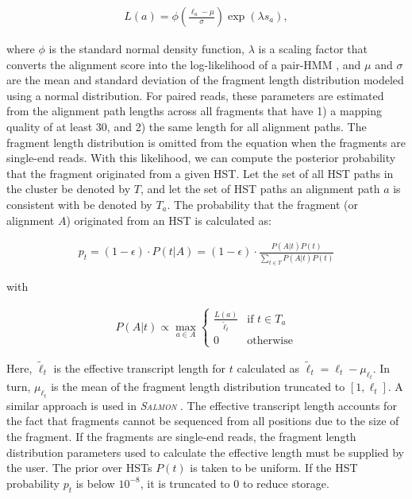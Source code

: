 \documentclass[11pt]{ucthesis}
\newcommand{\tool}[1]{\emph{\textsc{#1}}}
\begin{document}
\begin{align}
    L(a)= \phi\left(\frac{\ell_a - \mu}{\sigma}\right)\exp\left(\lambda s_a\right),
\end{align}
 
\noindent where $\phi$ is the standard normal density function, $\lambda$ is a scaling factor that converts the alignment score into the log-likelihood of a pair-HMM \cite{karlin1990methods}, and $\mu$ and $\sigma$ are the mean and standard deviation of the fragment length distribution modeled using a normal distribution. For paired reads, these parameters are estimated from the alignment path lengths across all fragments that have 1) a mapping quality of at least 30, and 2) the same length for all alignment paths. The fragment length distribution is omitted from the equation when the fragments are single-end reads. With this likelihood, we can compute the posterior probability that the fragment originated from a given HST. Let the set of all HST paths in the cluster be denoted by $T$, and let the set of HST paths an alignment path $a$ is consistent with be denoted by $T_a$. The probability that the fragment (or alignment $A$) originated from an HST is calculated as:

\begin{align}
    p_t=(1-\epsilon)\cdot P(t|A)=(1-\epsilon)\cdot\frac{P(A|t)P(t)}{\sum_{t\in T}P(A|t)P(t)}
\end{align}

\noindent with

\begin{align}
    P(A|t)\propto\max_{a\in A}\begin{cases}\frac{L(a)}{\widetilde{\ell}_t} & \mbox{if }t\in T_a\\0 & \mbox{otherwise}\end{cases}
\end{align}


\noindent Here, $\widetilde{\ell}_t$ is the effective transcript length for $t$ calculated as ${\widetilde{\ell}_t=\ell_t-\mu_{\ell_t}}$. In turn, $\mu_{\ell_t}$ is the mean of the fragment length distribution truncated to ${[1,\ell_t]}$. A similar approach is used in \tool{Salmon} \cite{patro2017salmon}. The effective transcript length accounts for the fact that fragments cannot be sequenced from all positions due to the size of the fragment. If the fragments are single-end reads, the fragment length distribution parameters used to calculate the effective length must be supplied by the user. The prior over HSTs $P(t)$ is taken to be uniform. If the HST probability $p_t$ is below $10^{-8}$, it is truncated to 0 to reduce storage. 
	
\end{document}
